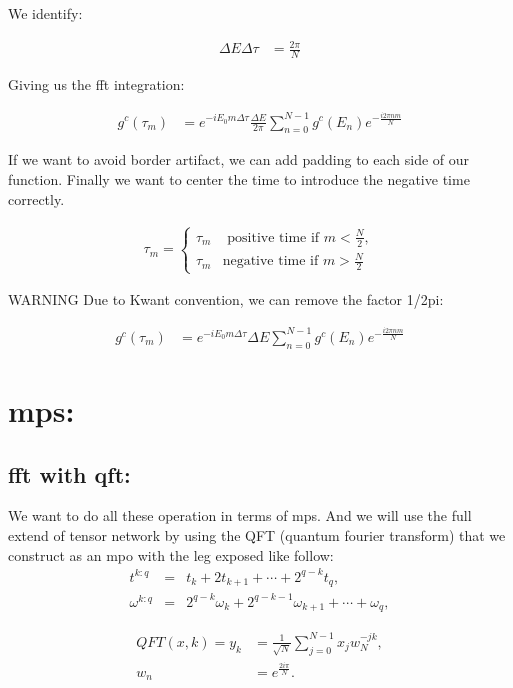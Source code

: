 \documentclass{article}
\begin{document}
	We identify:
	
	\begin{align}
		\Delta E \Delta \tau &= \frac{2\pi}{N}
	\end{align}
	
	Giving us the fft integration:
	
	\begin{align}
		g^{c}(\tau_m) &= e^{-iE_0m \Delta \tau} \frac{\Delta E}{2\pi} \sum_{n=0}^{N-1} g^c(E_n)e^{-\frac{i2\pi nm}{N}}
	\end{align}
	
	
	If we want to avoid border artifact, we can add padding to each side of our function. Finally we want to center the time to introduce the negative time correctly.
	
	\begin{align}
		\tau_m = \begin{cases} 
			\tau_m & \text{ positive time if } m<\frac{N}{2}, \\
			\tau_m & \text{negative time if } m>\frac{N}{2}
		\end{cases}
	\end{align}
	
	WARNING Due to Kwant convention, we can remove the factor 1/2pi:
	
	\begin{align}
		g^{c}(\tau_m) &= e^{-iE_0m \Delta \tau} \Delta E \sum_{n=0}^{N-1} g^c(E_n)e^{-\frac{i2\pi nm}{N}}
	\end{align}
	
	\section{mps:}
	
	\subsection{fft with qft:}
	We want to do all these operation in terms of mps. And we will use the full extend of tensor network by using the QFT (quantum fourier transform) that we construct as an mpo with the leg exposed like follow:
	\begin{eqnarray}
		t^{k:q} &=& t_k + 2t_{k+1} +\cdots + 2^{q-k} t_{q}, \\
		\omega^{k:q} &=& 2^{q-k} \omega_k + 2^{q-k-1}\omega_{k+1} +\cdots +  \omega_{q},
	\end{eqnarray}
	
	\begin{align}
		QFT(x,k) = y_k &= \frac{1}{\sqrt{N}}\sum_{j=0}^{N-1}x_j w_N^{-jk},\\
		w_n &= e^{\frac{2i\pi}{N}}.
	\end{align}
	
\end{document}
